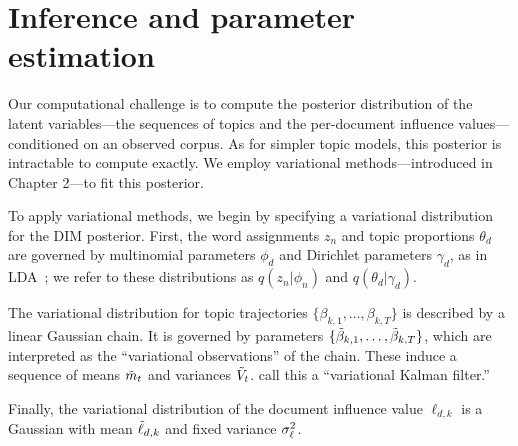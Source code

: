 \vspace{-2pt}
\section{Inference and parameter estimation}
\label{section:inference}

Our computational challenge is to compute the posterior distribution
of the latent variables---the sequences of topics and the per-document
influence values---conditioned on an observed corpus.  As for simpler
topic models, this posterior is intractable to compute exactly. We
employ variational methods---introduced in Chapter 2---to fit this
posterior.

To apply variational methods, we begin by specifying a variational
distribution for the DIM posterior.  First, the word assignments $z_n$
and topic proportions $\theta_d$ are governed by multinomial
parameters $\phi_d$ and Dirichlet parameters $\gamma_d$, as in
LDA~\cite{blei:2003}; we refer to these distributions as $q(z_n |
\phi_n)$ and $q(\theta_d | \gamma_d)$.

The variational distribution for topic trajectories
$\{\beta_{k,1}, \ldots, \beta_{k,T} \}$ is described by a linear
Gaussian chain.  It is governed by parameters $\{ \tilde{\beta}_{k,1}, \ldots,
\tilde{\beta}_{k,T} \}$, which are interpreted as the ``variational
observations'' of the chain.  These induce a sequence of means $\tilde{m}_t$
and variances $\tilde{V}_t$. \cite{blei:2006} call this a ``variational
Kalman filter.''

Finally, the variational distribution of the document influence value
$\ell_{d,k}$ is a Gaussian with mean $\tilde{\ell}_{d,k}$ and fixed variance
$\sigma^2_{\ell}$.




